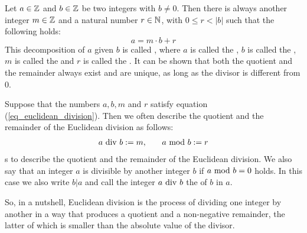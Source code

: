 Let $ a \in \mathbb{Z} $ and $ b \in \mathbb{Z} $ be two integers with $b\neq 0$. Then there is always another integer $ m \in \mathbb{Z} $ and a natural number $ r \in \mathbb{N} $, with $ 0 \leq r <|b| $ such that the following holds:
\begin{equation}
\label{eq_euclidean_division}
a = m \cdot b + r
\end{equation}
This decomposition of $a$ given $b$ is called , where $ a $ is called the , $ b $ is called the , $m$ is called the  and $r$ is called the . It can be shown that both the quotient and the remainder always exist and are unique, as long as the divisor is different from $0$.
\begin{notation}
\label{eq_euclidean_division_notation}
Suppose that the numbers $ a, b, m $ and $ r $ satisfy equation (\ref{eq_euclidean_division}). Then we often  describe the quotient and the remainder of the Euclidean division as follows:
\begin{equation}
\label{def_integer_division_and_modulus}
\begin{array}{lcr}
a \text{ div } b: = m, & & a \text{ mod } b: = r
\end{array}
\end{equation}s
to describe the quotient and the remainder of the Euclidean division. We also say that an integer $ a $ is divisible by another integer $ b $ if $ a \text{ mod } b = 0 $ holds. In this case we also write $ b | a $ and call the integer $a \text{ div } b$ the \label{def:cofactor} of $b$ in $a$.
\end{notation}
So, in a nutshell, Euclidean division is the process of dividing one integer by another in a way that produces a quotient and a non-negative remainder, the latter of which is smaller than the absolute value of the divisor.

